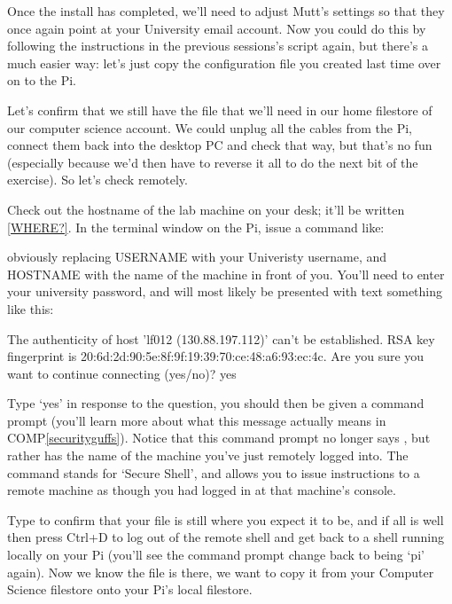 Once the install has completed, we'll need to adjust Mutt's settings so that they once again point at your University email account. Now you could do this by following the instructions in the previous sessions's script again, but there's a much easier way: let's just copy the configuration file you created last time over on to the Pi. 

Let's confirm that we still have the  file that we'll need in our home filestore of our computer science account. We could unplug all the cables from the Pi, connect them back into the desktop PC and check that way, but that's no fun (especially because we'd then have to reverse it all to do the next bit of the exercise). So let's check remotely. 

Check out the hostname of the lab machine on your desk; it'll be written \ref{WHERE?}. In the terminal window on the Pi, issue a command like:


obviously replacing USERNAME with your Univeristy username, and HOSTNAME with the name of the machine in front of you. You'll need to enter your university password, and will most likely be presented with text something like this:

\begin{ttoutenv}
The authenticity of host 'lf012 (130.88.197.112)' can't be established.
RSA key fingerprint is 20:6d:2d:90:5e:8f:9f:19:39:70:ce:48:a6:93:ec:4c.
Are you sure you want to continue connecting (yes/no)? yes
\end{ttoutenv}

Type `yes' in response to the question, you should then be given a command prompt (you'll learn more about what this message actually means in COMP\ref{securityguffs}). Notice that this command prompt no longer says , but rather has the name of the machine you've just remotely logged into. The  command stands for `Secure Shell', and allows you to issue instructions to a remote machine as though you had logged in at that machine's console.

Type  to confirm that your  file is still where you expect it to be, and if all is well then press Ctrl+D to log out of the remote shell and get back to a shell running locally on your Pi (you'll see the command prompt change back to being `pi' again). Now we know the file is there, we want to copy it from your Computer Science filestore onto your Pi's local filestore.

